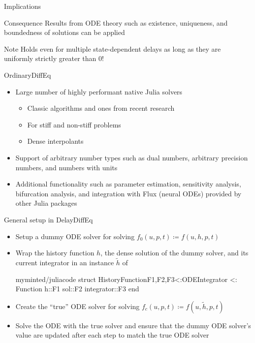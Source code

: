 \documentclass[aspectratio=169]{beamer}
\begin{document}
\begin{frame}{Implications}
  \begin{block}{Consequence}
    Results from ODE theory such as existence, uniqueness, and boundedness of solutions can be applied
  \end{block}

  \pause

  \begin{block}{Note}
    Holds even for multiple state-dependent delays as long as they are uniformly strictly greater than $0$!
  \end{block}
\end{frame}

\begin{frame}{OrdinaryDiffEq}
  \begin{itemize}[<+->]
  \item Large number of highly performant native Julia solvers
    \begin{itemize}[<1->]
    \item Classic algorithms and ones from recent research
    \item For stiff and non-stiff problems
    \item \alert{Dense interpolants}
    \end{itemize}
  \item Support of arbitrary number types such as dual numbers, arbitrary precision numbers, and numbers with units
  \item Additional functionality such as parameter estimation, sensitivity analysis, bifurcation analysis, and integration with Flux (neural ODEs) provided by other Julia packages
  \end{itemize}
\end{frame}

\begin{frame}[fragile]{General setup in DelayDiffEq}
  \begin{itemize}[<+->]
  \item Setup a dummy ODE solver for solving $f_0(u, p, t) \coloneqq f(u, h, p, t)$
  \item Wrap the history function $h$, the dense solution of the dummy solver, and its current integrator in an instance $\tilde{h}$ of
    \begin{tcblisting}{myminted/juliacode}
      struct HistoryFunction{F1,F2,F3<:ODEIntegrator} <: Function
        h::F1
        sol::F2
        integrator::F3
      end
    \end{tcblisting}
  \item Create the ``true'' ODE solver for solving $f_c(u, p, t) \coloneqq f(u, \tilde{h}, p, t)$
  \item Solve the ODE with the true solver and ensure that the dummy ODE solver's value are updated after each step to match the true ODE solver
  \end{itemize}
\end{frame}
\end{document}
